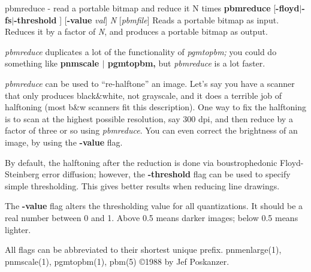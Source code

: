 pbmreduce - read a portable bitmap and reduce it N times
{\bf pbmreduce}
{\rm [}{\bf -floyd}{\rm $|$}{\bf -fs}{\rm $|$}{\bf -threshold}
{\rm ]}
{\rm [}{\bf -value}
{\it val}{\rm ]}
{\it N}
{\rm [}{\it pbmfile}{\rm ]}
Reads a portable bitmap as input.
Reduces it by a factor of
{\it N}{\rm ,}
and produces a portable bitmap as output.
\par
{\it pbmreduce}
duplicates a lot of the functionality of
{\it pgmtopbm;}
you could do something like
{\bf pnmscale $|$ pgmtopbm,}
but
{\it pbmreduce}
is a lot faster.
\par
{\it pbmreduce}
can be used to ``re-halftone'' an image.
Let's say you have a scanner that only produces black\&white, not
grayscale, and it does a terrible job of halftoning (most b\&w scanners
fit this description).
One way to fix the halftoning is to scan at the highest possible
resolution, say 300 dpi, and then reduce by a factor of three or
so using
{\it pbmreduce}{\rm .}
You can even correct the brightness of an image, by using the
{\bf -value}
flag.
\par
By default, the halftoning after the reduction is done via
boustrophedonic Floyd-Steinberg error diffusion; however, the
{\bf -threshold}
flag can be used to specify simple thresholding.  This gives better
results when reducing line drawings.
\par
The
{\bf -value}
flag alters the thresholding value for all quantizations.
It should be a real number between 0 and 1.
Above 0.5 means darker images; below 0.5 means lighter.
\par
All flags can be abbreviated to their shortest unique prefix.
pnmenlarge(1), pnmscale(1), pgmtopbm(1), pbm(5)
\copyright 1988 by Jef Poskanzer.
%
 
%

